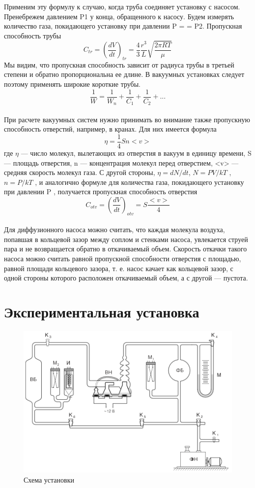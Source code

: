 \documentclass[12pt]{article}
\begin{document}
Применим эту формулу к случаю, когда труба соединяет установку с насосом.
Пренебрежем давлением P1 у конца, обращенного к насосу. Будем измерять количество газа, покидающего установку при давлении P =
= P2. Пропускная способность трубы
$$C_{tr}=(\frac{dV}{dt})_{tr}=\frac{4}{3}\frac{r^3}{L}\sqrt{\frac{2\pi RT}{\mu}}$$
Мы видим, что пропускная способность зависит от радиуса трубы в третьей степени и обратно пропорциональна ее длине. В вакуумных установках следует поэтому применять широкие короткие  трубы.
$$\frac{1}{W}=\frac{1}{W_n}+\frac{1}{C_1}+\frac{1}{C_2}+...$$
\newpage
\ \\
При расчете вакуумных систем нужно принимать во внимание также пропускную способность отверстий, например, в кранах. Для них имеется формула $$\eta=\frac{1}{4}Sn<v>$$
где $\eta$ — число молекул, вылетающих из отверстия в вакуум в единицу времени, S — площадь отверстия, n — концентрация молекул перед отверстием, <v> — средняя скорость молекул газа. С другой стороны, $\eta = dN/dt$, $N = PV/kT$ , $n = P/kT$ , и аналогично формуле для количества газа, покидающего установку при давлении P , получается пропускная способность отверстия
$$C_{otv}=(\frac{dV}{dt})_{otv}=S\frac{<v>}{4}$$
\ \\
Для диффузионного насоса можно считать, что каждая молекула воздуха, попавшая в кольцевой зазор между соплом и стенками насоса, увлекается струей пара и не возвращается обратно в откачиваемый объем. Скорость откачки такого насоса можно считать равной пропускной способности отверстия с площадью, равной площади кольцевого зазора, т. е. насос качает как кольцевой зазор, с одной стороны которого расположен откачиваемый объем, а с другой — пустота.

\section{Экспериментальная установка}

\begin{figure}[H]
	\centering
	\includegraphics[scale = 0.5]{./images/stand.png}
	\caption{Схема установки}
	\label{fig:stand}
\end{figure}
\end{document}

